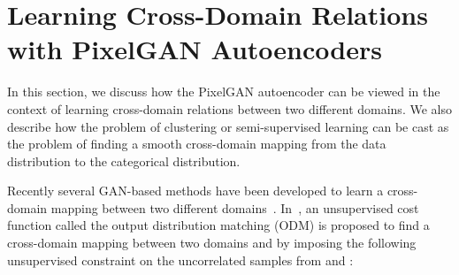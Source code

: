 \documentclass{article}
\begin{document}
\section{Learning Cross-Domain Relations with PixelGAN Autoencoders}\label{sec:cross-domain}


In this section, we discuss how the PixelGAN autoencoder can be viewed in the context of learning cross-domain relations between two different domains. We also describe how the problem of clustering or semi-supervised learning can be cast as the problem of finding a smooth cross-domain mapping from the data distribution to the categorical distribution. 

Recently several GAN-based methods have been developed to learn a cross-domain mapping between two different domains~\citep{discogan,cyclegan,cross-domain-ilya,aae,cross-domain-nlp}. In~\citep{cross-domain-ilya}, an unsupervised cost function called the output distribution matching (ODM) is proposed to find a cross-domain mapping  between two domains  and  by imposing the following unsupervised constraint on the uncorrelated samples from  and : 
\end{document}
